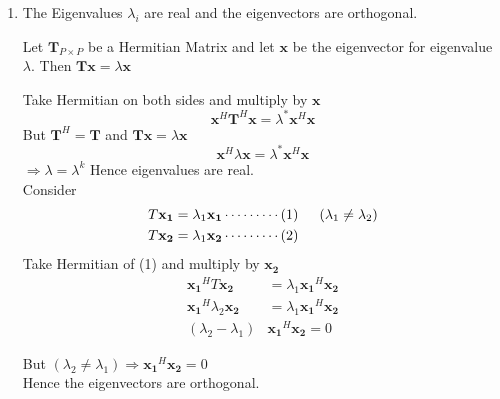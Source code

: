 \begin{enumerate}
\item The Eigenvalues $\lambda_i$ are real and the eigenvectors are orthogonal.

Let $\mathbf{T}_{P\times P}$ be a Hermitian Matrix and let $\mathbf x$ be the eigenvector for eigenvalue $\lambda$.
\indent Then $\mathbf{T}\mathbf{x} = \lambda \mathbf{x}$

Take Hermitian on both sides and multiply by $\mathbf{x}$
$$\mathbf{x}^H \mathbf{T}^H \mathbf{x} = \lambda^*\mathbf{x}^H\mathbf{x}$$
But $\mathbf{T}^H=\mathbf{T}$ and $\mathbf{T}\mathbf{x} = \lambda \mathbf{x}$
$$\mathbf{x}^H\lambda\mathbf{x} = \lambda^*\mathbf{x}^H\mathbf{x}$$
\indent $\Longrightarrow \lambda = \lambda^k$ \indent Hence eigenvalues are real.\\
Consider 
\begin{align*}
T\mathbf{x_1} &= \lambda_1\mathbf{x_1}\cdots\cdots\cdots(1) \indent (\lambda_1 \neq \lambda_2) \\
T\mathbf{x_2} &= \lambda_1\mathbf{x_2}\cdots\cdots\cdots(2)
\end{align*}
Take Hermitian of (1) and multiply by $\mathbf{x_2}$
\begin{align*}
\mathbf{x_1}^HT\mathbf{x_2} &= \lambda_1\mathbf{x_1}^H\mathbf{x_2}\\
\mathbf{x_1}^H\lambda_2\mathbf{x_2} &= \lambda_1\mathbf{x_1}^H\mathbf{x_2}\\
(\lambda_2 - \lambda_1)&\mathbf{x_1}^H\mathbf{x_2} = 0
\end{align*}

\indent But $(\lambda_2 \neq \lambda_1) \Rightarrow \mathbf{x_1}^H\mathbf{x_2}=0$ \\
Hence the eigenvectors are orthogonal.


\end{enumerate}

